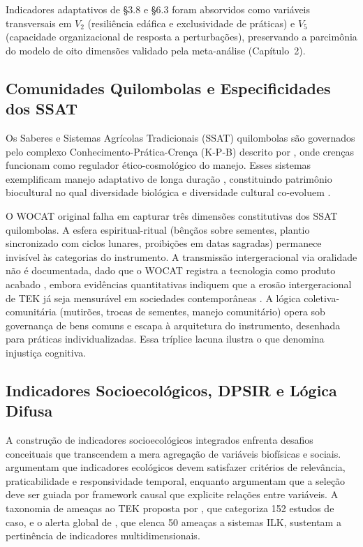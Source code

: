 Indicadores adaptativos de §3.8 e §6.3 foram absorvidos como variáveis transversais em $V_2$ (resiliência edáfica e exclusividade de práticas) e $V_5$ (capacidade organizacional de resposta a perturbações), preservando a parcimônia do modelo de oito dimensões validado pela meta-análise (Capítulo~2).

\subsection{Comunidades Quilombolas e Especificidades dos SSAT}

Os Saberes e Sistemas Agrícolas Tradicionais (SSAT) quilombolas são governados pelo complexo Conhecimento-Prática-Crença (K-P-B) descrito por , onde crenças funcionam como regulador ético-cosmológico do manejo. Esses sistemas exemplificam manejo adaptativo de longa duração \cite{Berkes2017,Berkes2012}, constituindo patrimônio biocultural no qual diversidade biológica e diversidade cultural co-evoluem \cite{Maffi2001,Pretty2009,Gepts2023}.

O WOCAT original falha em capturar três dimensões constitutivas dos SSAT quilombolas. A esfera espiritual-ritual (bênçãos sobre sementes, plantio sincronizado com ciclos lunares, proibições em datas sagradas) permanece invisível às categorias do instrumento. A transmissão intergeracional via oralidade não é documentada, dado que o WOCAT registra a tecnologia como produto acabado \cite{Polanyi1966}, embora evidências quantitativas indiquem que a erosão intergeracional de TEK já seja mensurável em sociedades contemporâneas \cite{ReyesGarcia2013evidence,HedgesKipila2020,Gruberg2022}. A lógica coletiva-comunitária (mutirões, trocas de sementes, manejo comunitário) opera sob governança de bens comuns \cite{Ostrom1990} e escapa à arquitetura do instrumento, desenhada para práticas individualizadas. Essa tríplice lacuna ilustra o que  denomina injustiça cognitiva.

\subsection{Indicadores Socioecológicos, DPSIR e Lógica Difusa}

A construção de indicadores socioecológicos integrados enfrenta desafios conceituais que transcendem a mera agregação de variáveis biofísicas e sociais.  argumentam que indicadores ecológicos devem satisfazer critérios de relevância, praticabilidade e responsividade temporal, enquanto  argumentam que a seleção deve ser guiada por framework causal que explicite relações entre variáveis. A taxonomia de ameaças ao TEK proposta por , que categoriza 152 estudos de caso, e o alerta global de , que elenca 50 ameaças a sistemas ILK, sustentam a pertinência de indicadores multidimensionais.

